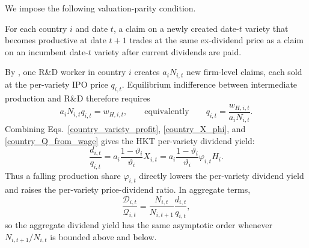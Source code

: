 \documentclass{article}
\begin{document}
We impose the following valuation-parity condition.

\begin{ass}\label{ass_entry_valuation}
For each country $i$ and date $t$, a claim on a newly created date-$t$ variety that becomes productive at date $t+1$ trades at the same ex-dividend price as a claim on an incumbent date-$t$ variety after current dividends are paid.
\end{ass}

By , one R\&D worker in country $i$ creates $a_iN_{i,t}$ new firm-level claims, each sold at the per-variety IPO price $q_{i,t}$. Equilibrium indifference between intermediate production and R\&D therefore requires
\begin{equation}\label{country_Q_from_wage}
a_iN_{i,t}q_{i,t}=w_{H,i,t},
\qquad
\text{equivalently}\qquad
q_{i,t}=\frac{w_{H,i,t}}{a_iN_{i,t}}.
\end{equation}
Combining Eqs.~\eqref{country_variety_profit}, \eqref{country_X_phi}, and \eqref{country_Q_from_wage} gives the HKT per-variety dividend yield:
\begin{equation}\label{country_dividend_yield}
\frac{d_{i,t}}{q_{i,t}}
=
a_i\frac{1-\vartheta_i}{\vartheta_i}X_{i,t}
=
a_i\frac{1-\vartheta_i}{\vartheta_i}\varphi_{i,t}H_i.
\end{equation}
Thus a falling production share $\varphi_{i,t}$ directly lowers the per-variety dividend yield and raises the per-variety price-dividend ratio. In aggregate terms,
\[
\frac{\mathcal D_{i,t}}{\mathcal Q_{i,t}}
=
\frac{N_{i,t}}{N_{i,t+1}}\frac{d_{i,t}}{q_{i,t}},
\]
so the aggregate dividend yield has the same asymptotic order whenever $N_{i,t+1}/N_{i,t}$ is bounded above and below.
\end{document}
